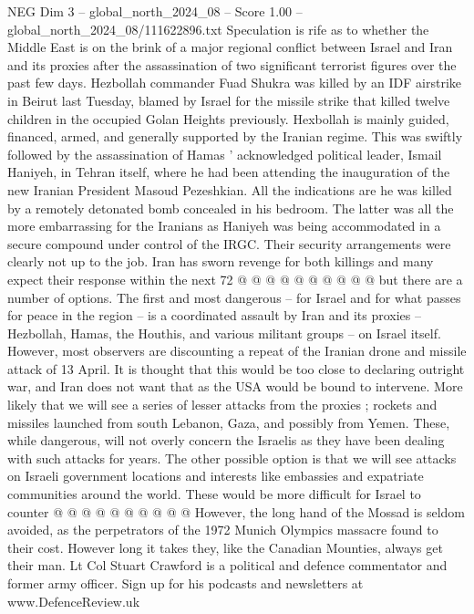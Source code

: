 \begin{textsample}{NEG Dim 3 – global\_north\_2024\_08 – Score 1.00 – global\_north\_2024\_08/111622896.txt}  \label{ex:f3_neg_320}
Speculation is rife as to whether the Middle East is on the brink of a major regional conflict between Israel and Iran and its proxies after the assassination of two significant terrorist figures over the past few days.
Hezbollah commander Fuad Shukra was killed by an IDF airstrike in Beirut last Tuesday, blamed by Israel for the missile strike that killed twelve children in the occupied Golan Heights previously.
Hexbollah is mainly guided, financed, armed, and generally supported by the Iranian regime.
This was swiftly followed by the assassination of Hamas ' acknowledged political leader, Ismail Haniyeh, in Tehran itself, where he had been attending the inauguration of the new Iranian President Masoud Pezeshkian.
All the indications are he was killed by a remotely detonated bomb concealed in his bedroom.
The latter was all the more embarrassing for the Iranians as Haniyeh was being accommodated in a secure compound under control of the IRGC.
Their security arrangements were clearly not up to the job.
Iran has sworn revenge for both killings and many expect their response within the next 72 @ @ @ @ @ @ @ @ @ @ but there are a number of options.
The first and most dangerous -- for Israel and for what passes for peace in the region -- is a coordinated assault by Iran and its proxies -- Hezbollah, Hamas, the Houthis, and various militant groups -- on Israel itself.
However, most observers are discounting a repeat of the Iranian drone and missile attack of 13 April.
It is thought that this would be too close to declaring outright war, and Iran does not want that as the USA would be bound to intervene.
More likely that we will see a series of lesser attacks from the proxies ; rockets and missiles launched from south Lebanon, Gaza, and possibly from Yemen.
These, while dangerous, will not overly concern the Israelis as they have been dealing with such attacks for years.
The other possible option is that we will see attacks on Israeli government locations and interests like embassies and expatriate communities around the world.
These would be more difficult for Israel to counter @ @ @ @ @ @ @ @ @ @ However, the long hand of the Mossad is seldom avoided, as the perpetrators of the 1972 Munich Olympics massacre found to their cost.
However long it takes they, like the Canadian Mounties, always get their man.
Lt Col Stuart Crawford is a political and defence commentator and former army officer.
Sign up for his podcasts and newsletters at www.DefenceReview.uk

\end{textsample}
